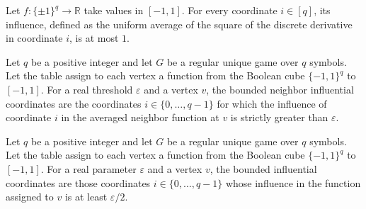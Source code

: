 \begin{theorem}
\label{FABL.RegularUniqueGame.boundedCubeFunction_influence_le_one}
\leanok
{}
Let $f:\{\pm1\}^q\to\mathbb R$ take values in $[-1,1]$. For every coordinate $i\in[q]$,
its influence, defined as the uniform average of the square of the discrete derivative
in coordinate $i$, is at most $1$.
\end{theorem}

\begin{definition}
\label{FABL.RegularUniqueGame.boundedNeighborInfluentialCoordinates}
\leanok
{}
Let $q$ be a positive integer and let $G$ be a regular unique game over $q$ symbols. Let
the table assign to each vertex a function from the Boolean cube $\{−1,1\}^{q}$ to
$[-1,1]$. For a real threshold $\varepsilon$ and a vertex $v$, the bounded neighbor
influential coordinates are the coordinates $i\in\{0,\ldots,q-1\}$ for which the
influence of coordinate $i$ in the averaged neighbor function at $v$ is strictly greater
than $\varepsilon$.
\end{definition}

\begin{definition}
\label{FABL.RegularUniqueGame.boundedInfluentialCoordinates}
\leanok
{}
Let $q$ be a positive integer and let $G$ be a regular unique game over $q$ symbols. Let
the table assign to each vertex a function from the Boolean cube $\{−1,1\}^{q}$ to
$[-1,1]$. For a real parameter $\varepsilon$ and a vertex $v$, the bounded influential
coordinates are those coordinates $i\in\{0,\ldots,q-1\}$ whose influence in the
function assigned to $v$ is at least $\varepsilon/2$.
\end{definition}

